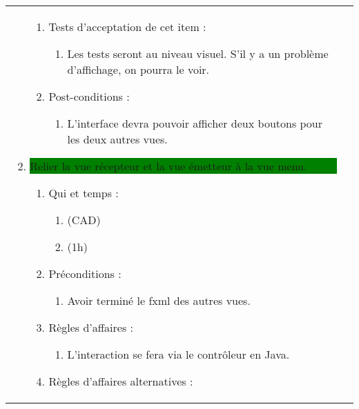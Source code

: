 \begin{longtable}{|l|p{}|}
\begin{enumerate}[label*=\arabic*.]
\begin{enumerate}[label*=\arabic*.]
                                \item Tests d'acceptation de cet item :
                                \begin{enumerate}[label*=\arabic*.]
                                    \item Les tests seront au niveau visuel. S'il y a un problème d'affichage, on pourra le voir.
                                \end{enumerate}
                                \item Post-conditions :
                                \begin{enumerate}[label*=\arabic*.]
                                    \item L'interface devra pouvoir afficher deux boutons pour les deux autres vues.
                                \end{enumerate}
                            \end{enumerate}
             \item \colorbox{Green}{\parbox{13cm}{ Relier la vue récepteur et la vue émetteur à la vue menu.}}
                \begin{enumerate}[label*=\arabic*.]
                                \item Qui et temps :
                                \begin{enumerate}[label*=\arabic*.]
                                    \item (CAD)
                                    \item (1h)
                                \end{enumerate}
                                \item Préconditions :
                                \begin{enumerate}[label*=\arabic*.]
                                    \item Avoir terminé le fxml des autres vues.
                                \end{enumerate}
                                \item Règles d'affaires :
                                \begin{enumerate}[label*=\arabic*.]
                                    \item L'interaction se fera via le contrôleur en Java.
                                \end{enumerate}
                                \item Règles d'affaires alternatives :

\end{enumerate}
\end{enumerate}
\end{longtable}
